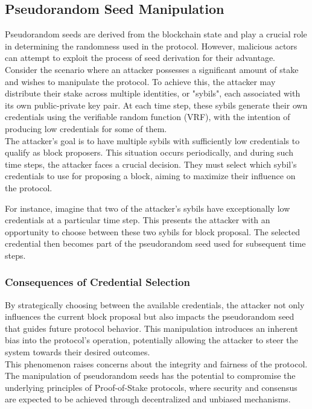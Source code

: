 \subsection{Pseudorandom Seed Manipulation}
Pseudorandom seeds are derived from the blockchain state and play a crucial role in determining the randomness used in the protocol. However, malicious actors can attempt to exploit the process of seed derivation for their advantage.\\
Consider the scenario where an attacker possesses a significant amount of stake and wishes to manipulate the protocol. To achieve this, the attacker may distribute their stake across multiple identities, or "sybils", each associated with its own public-private key pair. At each time step, these sybils generate their own credentials using the verifiable random function (VRF), with the intention of producing low credentials for some of them.\\
The attacker's goal is to have multiple sybils with sufficiently low credentials to qualify as block proposers. This situation occurs periodically, and during such time steps, the attacker faces a crucial decision. They must select which sybil's credentials to use for proposing a block, aiming to maximize their influence on the protocol.

For instance, imagine that two of the attacker's sybils have exceptionally low credentials at a particular time step. This presents the attacker with an opportunity to choose between these two sybils for block proposal. The selected credential then becomes part of the pseudorandom seed used for subsequent time steps.

\subsubsection{Consequences of Credential Selection}
By strategically choosing between the available credentials, the attacker not only influences the current block proposal but also impacts the pseudorandom seed that guides future protocol behavior. This manipulation introduces an inherent bias into the protocol's operation, potentially allowing the attacker to steer the system towards their desired outcomes.\\
This phenomenon raises concerns about the integrity and fairness of the protocol. The manipulation of pseudorandom seeds has the potential to compromise the underlying principles of Proof-of-Stake protocols, where security and consensus are expected to be achieved through decentralized and unbiased mechanisms.

